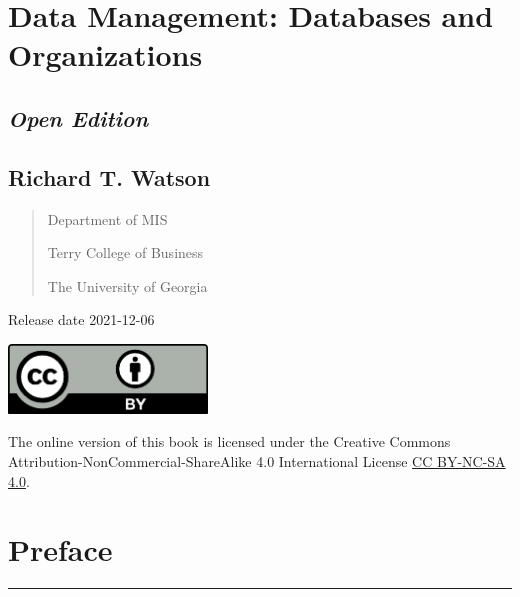 \documentclass[
]{article}
\author{}
\date{\vspace{-2.5em}}
\begin{document}
{
\setcounter{tocdepth}{2}
\tableofcontents
}
\hypertarget{data-management-databases-and-organizations}{%
\section*{Data Management: Databases and Organizations}\label{data-management-databases-and-organizations}}

\hypertarget{open-edition}{%
\subsection*{\texorpdfstring{\emph{Open Edition}}{Open Edition}}\label{open-edition}}

\hypertarget{richard-t.-watson}{%
\subsection*{Richard T. Watson}\label{richard-t.-watson}}

\begin{quote}
Department of MIS

Terry College of Business

The University of Georgia
\end{quote}

Release date 2021-12-06

\includegraphics[width=2.08333in,height=\textheight]{Figures/Front matter/CC.by.png}

The online version of this book is licensed under the Creative Commons Attribution-NonCommercial-ShareAlike 4.0 International License \href{https://creativecommons.org/licenses/by-nc-sa/4.0/}{CC BY-NC-SA 4.0}.

\hypertarget{preface}{%
\section*{Preface}\label{preface}}

\begin{center}\rule{0.5\linewidth}{0.5pt}\end{center}
\end{document}
